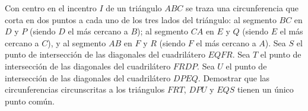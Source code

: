 Con centro en el incentro $I$ de un triángulo $ABC$ se traza una circunferencia que corta en dos puntos a cada uno de los tres lados del triángulo: al segmento $BC$ en $D$ y $P$ (siendo $D$ el más cercano a $B$); al segmento $CA$ en $E$ y $Q$ (siendo $E$ el más cercano a $C$), y al segmento $AB$ en $F$ y $R$ (siendo $F$ el más cercano a $A$). \newline 
Sea $S$ el punto de intersección de las diagonales del cuadrilátero $EQFR$. Sea $T$ el punto de intersección de las diagonales del cuadrilátero $FRDP$. Sea $U$ el punto de intersección de las diagonales del cuadrilátero $DPEQ$. Demostrar que las circunferencias circunscritas a los triángulos $FRT$, $DPU$ y $EQS$ tienen un único punto común.

